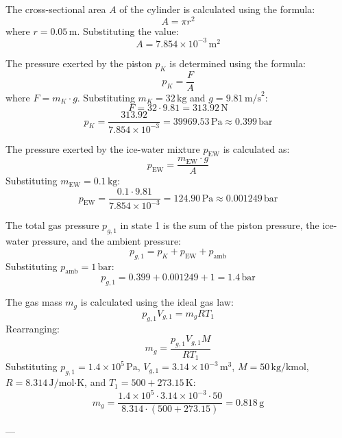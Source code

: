 The cross-sectional area \( A \) of the cylinder is calculated using the formula:  
\[
A = \pi r^2
\]  
where \( r = 0.05 \, \text{m} \). Substituting the value:  
\[
A = 7.854 \times 10^{-3} \, \text{m}^2
\]  

The pressure exerted by the piston \( p_K \) is determined using the formula:  
\[
p_K = \frac{F}{A}
\]  
where \( F = m_K \cdot g \). Substituting \( m_K = 32 \, \text{kg} \) and \( g = 9.81 \, \text{m/s}^2 \):  
\[
F = 32 \cdot 9.81 = 313.92 \, \text{N}
\]  
\[
p_K = \frac{313.92}{7.854 \times 10^{-3}} = 39969.53 \, \text{Pa} \approx 0.399 \, \text{bar}
\]  

The pressure exerted by the ice-water mixture \( p_{\text{EW}} \) is calculated as:  
\[
p_{\text{EW}} = \frac{m_{\text{EW}} \cdot g}{A}
\]  
Substituting \( m_{\text{EW}} = 0.1 \, \text{kg} \):  
\[
p_{\text{EW}} = \frac{0.1 \cdot 9.81}{7.854 \times 10^{-3}} = 124.90 \, \text{Pa} \approx 0.001249 \, \text{bar}
\]  

The total gas pressure \( p_{g,1} \) in state 1 is the sum of the piston pressure, the ice-water pressure, and the ambient pressure:  
\[
p_{g,1} = p_K + p_{\text{EW}} + p_{\text{amb}}
\]  
Substituting \( p_{\text{amb}} = 1 \, \text{bar} \):  
\[
p_{g,1} = 0.399 + 0.001249 + 1 = 1.4 \, \text{bar}
\]  

The gas mass \( m_g \) is calculated using the ideal gas law:  
\[
p_{g,1} V_{g,1} = m_g R T_1
\]  
Rearranging:  
\[
m_g = \frac{p_{g,1} V_{g,1} M}{R T_1}
\]  
Substituting \( p_{g,1} = 1.4 \times 10^5 \, \text{Pa} \), \( V_{g,1} = 3.14 \times 10^{-3} \, \text{m}^3 \), \( M = 50 \, \text{kg/kmol} \), \( R = 8.314 \, \text{J/mol·K} \), and \( T_1 = 500 + 273.15 \, \text{K} \):  
\[
m_g = \frac{1.4 \times 10^5 \cdot 3.14 \times 10^{-3} \cdot 50}{8.314 \cdot (500 + 273.15)} = 0.818 \, \text{g}
\]  

---